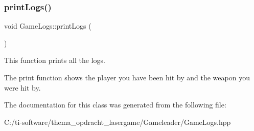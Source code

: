 \subsubsection{\texorpdfstring{print\+Logs()}{printLogs()}}
{\footnotesize\ttfamily void Game\+Logs\+::print\+Logs (\begin{DoxyParamCaption}{ }\end{DoxyParamCaption})\hspace{0.3cm}{\ttfamily [inline]}}



This function prints all the logs. 

The print function shows the player you have been hit by and the weapon you were hit by. 

The documentation for this class was generated from the following file\+:\begin{DoxyCompactItemize}
\item 
C\+:/ti-\/software/thema\+\_\+opdracht\+\_\+lasergame/\+Gameleader/Game\+Logs.\+hpp\end{DoxyCompactItemize}
